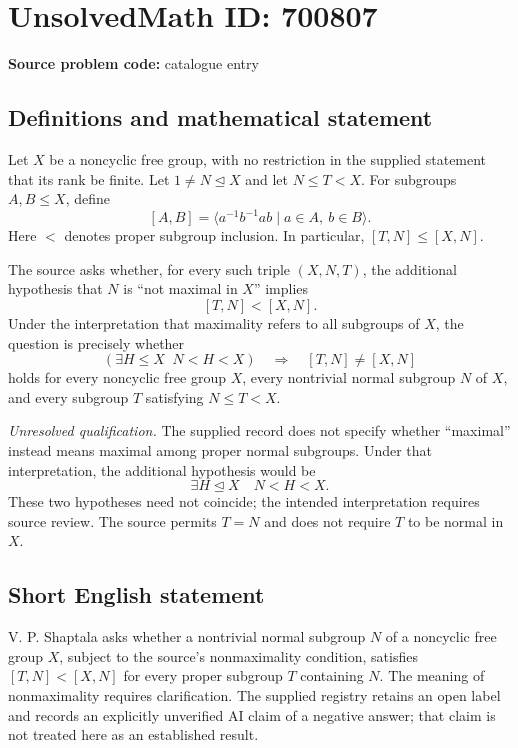 \documentclass[11pt]{article}
\begin{document}
\section*{UnsolvedMath ID: 700807}
\textbf{Source problem code:} catalogue entry
\subsection{Definitions and mathematical statement}
Let \(X\) be a noncyclic free group, with no restriction in the supplied statement that its rank be finite. Let \(1\ne N\trianglelefteq X\) and let \(N\le T<X\). For subgroups \(A,B\le X\), define
\[
[A,B]=\langle a^{-1}b^{-1}ab\mid a\in A,\ b\in B\rangle.
\]
Here \(<\) denotes proper subgroup inclusion. In particular, \([T,N]\le [X,N]\).

The source asks whether, for every such triple \((X,N,T)\), the additional hypothesis that \(N\) is ``not maximal in \(X\)'' implies
\[
[T,N]<[X,N].
\]
Under the interpretation that maximality refers to all subgroups of \(X\), the question is precisely whether
\[
\left(\exists H\le X\;\;N<H<X\right)
\quad\Longrightarrow\quad
[T,N]\ne[X,N]
\]
holds for every noncyclic free group \(X\), every nontrivial normal subgroup \(N\) of \(X\), and every subgroup \(T\) satisfying \(N\le T<X\).

\emph{Unresolved qualification.} The supplied record does not specify whether ``maximal'' instead means maximal among proper normal subgroups. Under that interpretation, the additional hypothesis would be
\[
\exists H\trianglelefteq X\quad N<H<X.
\]
These two hypotheses need not coincide; the intended interpretation requires source review. The source permits \(T=N\) and does not require \(T\) to be normal in \(X\).
\subsection{Short English statement}
V. P. Shaptala asks whether a nontrivial normal subgroup \(N\) of a noncyclic free group \(X\), subject to the source's nonmaximality condition, satisfies \([T,N]<[X,N]\) for every proper subgroup \(T\) containing \(N\). The meaning of nonmaximality requires clarification. The supplied registry retains an open label and records an explicitly unverified AI claim of a negative answer; that claim is not treated here as an established result.
\end{document}
